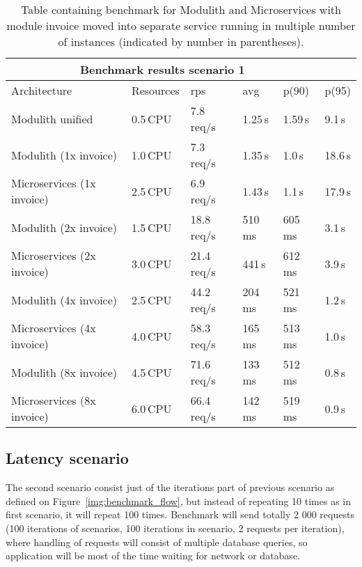 \begin{table}
    \begin{tabular}{ |p{4cm}||p{3cm}|p{1.5cm}|p{1.5cm}|p{1.5cm}|p{1.5cm}| }
        \hline
        \multicolumn{5}{|c|}{Benchmark results scenario 1}                                  \\
        \hline
        Architecture                & Resources & rps         & avg     & p(90)   & p(95)   \\
        \hline
        Modulith unified            & 0.5\,CPU  & 7.8\,req/s  & 1.25\,s & 1.59\,s & 9.1\,s  \\
        \rowcolor{Gray}
        Modulith (1x invoice)       & 1.0\,CPU  & 7.3\,req/s  & 1.35\,s & 1.0\,s  & 18.6\,s \\
        \rowcolor{Gray}
        Microservices (1x invoice)  & 2.5\,CPU  & 6.9\,req/s  & 1.43\,s & 1.1\,s  & 17.9\,s \\
        Modulith (2x invoice)       & 1.5\,CPU  & 18.8\,req/s & 510\,ms & 605\,ms & 3.1\,s  \\
        Microservices (2x invoice)  & 3.0\,CPU  & 21.4\,req/s & 441\,s  & 612\,ms & 3.9\,s  \\
        \rowcolor{Gray}
        Modulith (4x invoice)       & 2.5\,CPU  & 44.2\,req/s & 204\,ms & 521\,ms & 1.2\,s  \\
        \rowcolor{Gray}
        Microservices  (4x invoice) & 4.0\,CPU  & 58.3\,req/s & 165\,ms & 513\,ms & 1.0\,s  \\
        Modulith (8x invoice)       & 4.5\,CPU  & 71.6\,req/s & 133\,ms & 512\,ms & 0.8\,s  \\
        Microservices (8x invoice)  & 6.0\,CPU  & 66.4\,req/s & 142\,ms & 519\,ms & 0.9\,s  \\
        \hline
    \end{tabular}
    \caption{Table containing benchmark for Modulith and Microservices with module invoice moved into separate service running in multiple number of instances (indicated by number in parentheses).\label{table:benchmark_modulith_instances}}
\end{table}


\subsection{Latency scenario}
The second scenario consist just of the iterations part of previous scenario as defined on Figure~\ref{img:benchmark_flow}, but instead of repeating 10 times as in first scenario, it will repeat 100 times. Benchmark will send totally 2 000 requests (100 iterations of scenarios, 100 iterations in scenario, 2 requests per iteration), where handling of requests will consist of multiple database queries, so application will be most of the time waiting for network or database.

